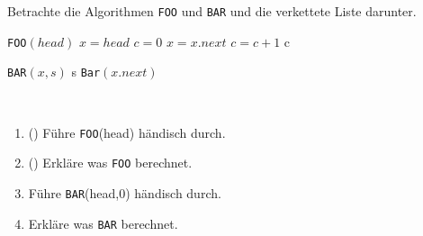 \documentclass{uebung_cs}
\begin{document}
\begin{aufgabe}
	Betrachte die Algorithmen \texttt{FOO} und \texttt{BAR} und die verkettete Liste darunter.
	\begin{center}
	\begin{minipage}{0.45\textwidth}
		\begin{algorithmic}
			\STATE \texttt{FOO}$(head)$
			\STATE $x = head$
			\STATE $c = 0$
				\STATE $x = x.next$
				\STATE $c = c + 1$
			\ENDWHILE
			\RETURN c
		\end{algorithmic}
	\end{minipage}%
		\hfill
	\begin{minipage}{0.45\textwidth}
		\begin{algorithmic}
			\STATE \texttt{BAR}$(x,s)$
			\IF{$x == null$}
				\RETURN s
			\ELSE
				\RETURN \texttt{Bar}$(x.next)$
			\ENDIF
		\end{algorithmic}
	\end{minipage}\\%
	\end{center}
	
	\begin{center}
	\end{center}

	\begin{enumerate}
		\item (\warmup) Führe \texttt{FOO}(head) händisch durch.
		\item (\warmup) Erkläre was \texttt{FOO} berechnet.
		\item Führe \texttt{BAR}(head,0) händisch durch.
		\item Erkläre was \texttt{BAR} berechnet.
	\end{enumerate}
\end{aufgabe}
\end{document}
